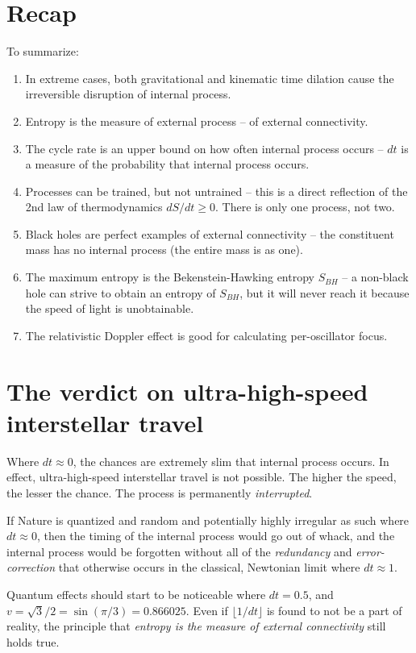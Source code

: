 \documentclass[12pt]{article}
\begin{document}
\section{Recap}

To summarize:
\begin{enumerate}
\item In extreme cases, both gravitational and kinematic time dilation cause the irreversible disruption of internal process.
\item Entropy is the measure of external process -- of external connectivity.
\item The cycle rate is an upper bound on how often internal process occurs -- $dt$ is a measure of the probability that internal process occurs.
\item Processes can be trained, but not untrained -- this is a direct reflection of the 2nd law of thermodynamics $dS/dt \geq 0$. There is only one process, not two.
\item Black holes are perfect examples of external connectivity -- the constituent mass has no internal process (the entire mass is as one).
\item The maximum entropy is the Bekenstein-Hawking entropy $S_{BH}$ -- a non-black hole can strive to obtain an entropy of $S_{BH}$, but it will never reach it because the speed of light is unobtainable.
\item The relativistic Doppler effect is good for calculating per-oscillator focus.
\end{enumerate}




\section{The verdict on ultra-high-speed interstellar travel}
Where $dt \approx 0$, the chances are extremely slim that internal process occurs.
In effect, ultra-high-speed interstellar travel is not possible.
The higher the speed, the lesser the chance.
The process is permanently \textit{interrupted}.

If Nature is quantized and random and potentially highly irregular as such where $dt \approx 0$, then the timing of the internal process would go out of whack, and the internal process would be forgotten without all of the {\textit{redundancy}} and {\textit{error-correction}} that otherwise occurs in the classical, Newtonian limit where $dt \approx 1$.

Quantum effects should start to be noticeable where $dt = 0.5$, and $v = \sqrt{3} / 2 = \sin(\pi/3) = 0.866025$.
Even if $\lfloor{1}/{dt} \rfloor$ is found to not be a part of reality, the principle that {\textit{entropy is the measure of external connectivity}} still holds true.
\end{document}

